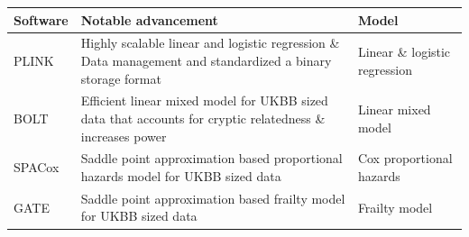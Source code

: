 \begin{table}[h]
	\centering
	\begin{tabularx}{\textwidth}{l X l}
		\hline
		Software	&	Notable advancement		&	Model \\
		\hline
		PLINK\cite{chang2015second,purcell2007plink}	&
		Highly scalable linear and logistic regression \& Data management and standardized a binary storage format	&
		Linear \& logistic regression	\\
		BOLT\cite{loh2015efficient}	&
		Efficient linear mixed model for UKBB sized data that accounts for cryptic relatedness \& increases power	&
		Linear mixed model	\\
		SPACox\cite{bi2020fast}	&	
		Saddle point approximation based proportional hazards model for UKBB sized data &
		Cox proportional hazards \\
		GATE\cite{dey2022efficient}	&
		Saddle point approximation based frailty model for UKBB sized data	&
		Frailty model \\
		\hline
	\end{tabularx}
	\label{table:GWASoverview}
\end{table}

